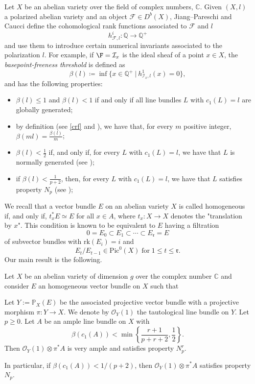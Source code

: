 \documentclass[11pt,letter]{amsart}
\numberwithin{equation}{section}
\begin{document}
Let $X$ be an abelian variety over the field of complex numbers, $\mathbb{C}$. 
Given $(X,l)$ a polarized abelian variety and an object $\mathcal{F}\in D^b(X)$, Jiang--Pareschi \cite{JiPa2020} and Caucci \cite{Caucci} define the {cohomological rank functions} associated to $\mathcal{F}$ and $l$
\[
h^i_{\mathcal{F},l}:\mathbb{Q}\rightarrow\mathbb{Q}^+
\]
and use them to introduce certain numerical invariants associated to the polarization $l$. For example, if $\mathcal{\F}=\mathcal{I}_x$ is the ideal sheaf of a point $x\in X$, the \emph{basepoint-freeness threshold} is defined as
\[\beta(l)\coloneq\inf\{x\in\mathbb{{Q}}^+\:|\:h^1_{\mathcal{I}_x,l}(x)=0\},\] 
and has the following properties:
\begin{itemize}
    \item $\beta(l)\leq 1$ and $\beta(l)<1$ if and only if all line bundles $L$ with $c_1(L)=l$ are globally generated;
    \item by definition (see \ref{crf} and \cite[Proof of Cor. 1.2]{Caucci}), we have that, for every $m$ positive integer, $\beta(ml)=\frac{\beta(l)}{m}$;
    \item $\beta(l)<\frac{1}{2}$ if, and only if, for every $L$ with $c_1(L)=l$, we have that $L$ is normally generated (see \cite[Cor. E]{JiPa2020});
    \item if $\beta(l)<\frac{1}{p+2}$, then, for every $L$ with $c_1(L)=l$, we have that $L$ satisfies property $N_p$ (see \cite[Thm. 1.1]{Caucci});
\end{itemize}
We recall that a vector bundle $E$ on an abelian variety $X$ is called homogeneous if, and only if, $t_x^*E\simeq E$ for all $x\in A$, where $t_x:X\rightarrow X$ denotes the "translation by $x$".  This condition is known to be equivalent to $E$ having a filtration 
\[
0=E_0\subset E_1\subset \cdots \subset E_\mathfrak{r}=E
\]
of subvector bundles with $\mathrm{rk}(E_i)=i$  and
\[
E_t/E_{t-1}\in\mathrm{Pic}^0(X)\;\text{for}\;1\leq t\leq\mathfrak{r}.
\] 
 Our main result is the following.
\begin{introthm}\label{TheoremA}%
Let $X$ be an abelian variety of dimension $g$ over the complex number $\mathbb{C}$ and consider $E$ an homogeneous vector bundle on $X$ such that

Let $Y:=\mathbb{P}_X(E)$ be the associated projective vector bundle with a projective morphism $\pi:Y\rightarrow X$. We denote by $\mathcal{O}_Y(1)$ the tautological line bundle on $Y$. Let $p\geq 0$. Let $A$ be an ample line bundle on $X$ with 
\[\beta(c_1(A))<\min\left\{\frac{r+1}{p+r+2},\frac{1}{2}\right\}.\] Then $\mathcal{O}_Y(1)\otimes\pi^* A$ is very ample and satisfies property $N_p^r$.

In particular, if $\beta(c_1(A))<1/(p+2)$, then $\mathcal{O}_Y(1)\otimes\pi^* A$ satisfies property $N_p$.

\end{introthm}
\end{document}
